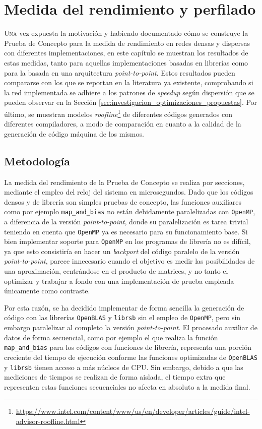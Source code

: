 \chapter{Medida del rendimiento y perfilado}
\label{chap:medida_rendimiento_perfilado}

\lettrine{U}{na} vez expuesta la motivación y habiendo documentado cómo se construye la Prueba de Concepto para la medida de rendimiento en redes densas y dispersas con diferentes implementaciones, en este capítulo se muestran los resultados de estas medidas, tanto para aquellas implementaciones basadas en librerías como para la basada en una arquitectura \textit{point-to-point}. Estos resultados pueden compararse con los que se reportan en la literatura ya existente, comprobando si la red implementada se adhiere a los patrones de \textit{speedup} según dispersión que se pueden observar en la Sección \ref{sec:investigacion_optimizaciones_propuestas}. Por último, se muestran modelos \textit{roofline}\footnote{\url{https://www.intel.com/content/www/us/en/developer/articles/guide/intel-advisor-roofline.html}} de diferentes códigos generados con diferentes compiladores, a modo de comparación en cuanto a la calidad de la generación de código máquina de los mismos.

\section{Metodología}
\label{sec:metodologia}
La medida del rendimiento de la Prueba de Concepto se realiza por secciones, mediante el empleo del reloj del sistema en microsegundos. Dado que los códigos densos y de librería son simples pruebas de concepto, las funciones auxiliares como por ejemplo \texttt{map\_and\_bias} no están debidamente paralelizadas con \texttt{OpenMP}, a diferencia de la versión \textit{point-to-point}, donde su paralelización es tarea trivial teniendo en cuenta que \texttt{OpenMP} ya es necesario para su funcionamiento base. Si bien implementar soporte para \texttt{OpenMP} en los programas de librería no es difícil, ya que esto consistiría en hacer un \textit{backport} del código paralelo de la versión \textit{point-to-point}, parece innecesario cuando el objetivo es medir las posibilidades de una aproximación, centrándose en el producto de matrices, y no tanto el optimizar y trabajar a fondo con una implementación de prueba empleada únicamente como contraste.

Por esta razón, se ha decidido implementar de forma sencilla la generación de código con las librerías \texttt{OpenBLAS} y \texttt{librsb} sin el empleo de \texttt{OpenMP}, pero sin embargo paralelizar al completo la versión \textit{point-to-point}. El procesado auxiliar de datos de forma secuencial, como por ejemplo el que realiza la función \texttt{map\_and\_bias} para los códigos con funciones de librería, representa una porción creciente del tiempo de ejecución conforme las funciones optimizadas de \texttt{OpenBLAS} y \texttt{librsb} tienen acceso a más núcleos de CPU. Sin embargo, debido a que las mediciones de tiempos se realizan de forma aislada, el tiempo extra que representen estas funciones secuenciales no afecta en absoluto a la medida final.

